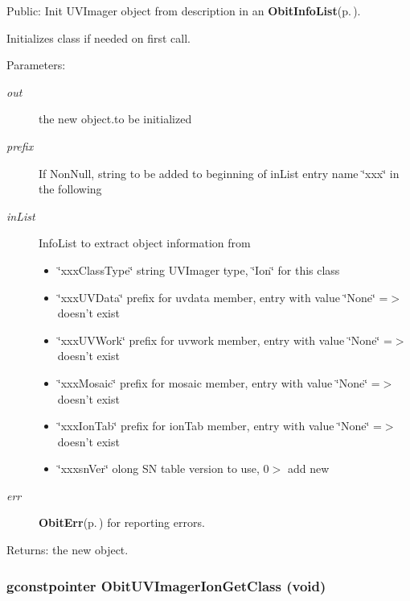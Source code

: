 Public: Init UVImager object from description in an {\bf Obit\-Info\-List}{\rm (p.\,\pageref{structObitInfoList})}. 

Initializes class if needed on first call. \begin{Desc}
\item[Parameters:]
\begin{description}
\item[{\em out}]the new object.to be initialized \item[{\em prefix}]If Non\-Null, string to be added to beginning of in\-List entry name \char`\"{}xxx\char`\"{} in the following \item[{\em in\-List}]Info\-List to extract object information from \begin{itemize}
\item \char`\"{}xxx\-Class\-Type\char`\"{} string UVImager type, \char`\"{}Ion\char`\"{} for this class \item \char`\"{}xxx\-UVData\char`\"{} prefix for uvdata member, entry with value \char`\"{}None\char`\"{} =$>$ doesn't exist \item \char`\"{}xxx\-UVWork\char`\"{} prefix for uvwork member, entry with value \char`\"{}None\char`\"{} =$>$ doesn't exist \item \char`\"{}xxx\-Mosaic\char`\"{} prefix for mosaic member, entry with value \char`\"{}None\char`\"{} =$>$ doesn't exist \item \char`\"{}xxx\-Ion\-Tab\char`\"{} prefix for ion\-Tab member, entry with value \char`\"{}None\char`\"{} =$>$ doesn't exist \item \char`\"{}xxxsn\-Ver\char`\"{} olong SN table version to use, 0$>$ add new \end{itemize}
\item[{\em err}]{\bf Obit\-Err}{\rm (p.\,\pageref{structObitErr})} for reporting errors. \end{description}
\end{Desc}
\begin{Desc}
\item[Returns:]the new object. \end{Desc}
\subsubsection{\setlength{\rightskip}{0pt plus 5cm}gconstpointer Obit\-UVImager\-Ion\-Get\-Class (void)}\label{ObitUVImagerIon_8h_a6}


